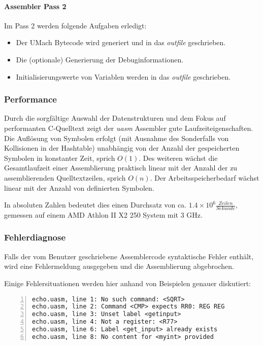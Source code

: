 \paragraph{Assembler Pass 2}

Im Pass 2 werden folgende Aufgaben erledigt:
\begin{itemize}
    \item Der UMach Bytecode wird generiert und in das \emph{outfile}
          geschrieben.
    \item Die (optionale) Generierung der Debuginformationen.
    \item Initialisierungswerte von Variablen werden in das \emph{outfile}
          geschrieben.
\end{itemize}

\subsubsection{Performance}

Durch die sorgfältige Auswahl der Datenstrukturen und dem Fokus auf performanten
C-Quelltext zeigt der \emph{uasm} Assembler gute Laufzeiteigenschaften.
Die Auflösung von Symbolen erfolgt (mit Ausnahme des Sonderfalls von Kollisionen
in der Hashtable) unabhängig von der Anzahl der gespeicherten Symbolen in
konstanter Zeit, sprich $O(1)$.
Des weiteren wächst die Gesamtlaufzeit einer Assemblierung praktisch linear mit
der Anzahl der zu assemblierenden Quelltextzeilen, sprich $O(n)$.
Der Arbeitsspeicherbedarf wächst linear mit der Anzahl von definierten Symbolen.

In absoluten Zahlen bedeutet dies einen Durchsatz von ca.
$1.4 \times 10^6 \frac{Zeilen}{Sekunde}$, gemessen auf einem
AMD Athlon II X2 250 System mit 3 GHz.

\subsubsection{Fehlerdiagnose}

Falls der vom Benutzer geschriebene Assemblercode syntaktische Fehler enthält,
wird eine Fehlermeldung ausgegeben und die Assemblierung abgebrochen.

Einige Fehlersituationen werden hier anhand von Beispielen genauer diskutiert:
\begin{lstlisting}[numbers=left, numberstyle=\tiny]
echo.uasm, line 1: No such command: <SQRT>
echo.uasm, line 2: Command <CMP> expects RR0: REG REG
echo.uasm, line 3: Unset label <getinput>
echo.uasm, line 4: Not a register: <R77>
echo.uasm, line 6: Label <get_input> already exists
echo.uasm, line 8: No content for <myint> provided
\end{lstlisting}

